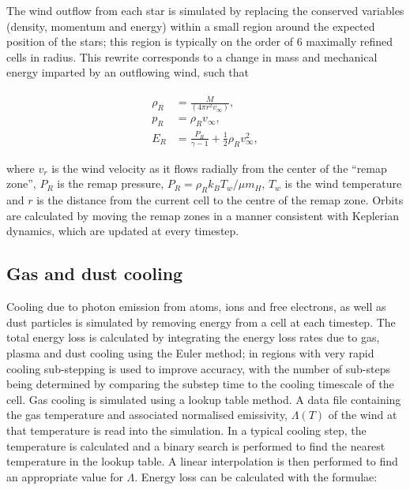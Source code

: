 The wind outflow from each star is simulated by replacing the conserved variables (density, momentum and energy) within a small region around the expected position of the stars; this region is typically on the order of 6 maximally refined cells in radius.
This rewrite corresponds to a change in mass and mechanical energy imparted by an outflowing wind, such that

\begin{subequations}
  \begin{align}
    \rho_R & = \frac{\dot M}{(4 \pi r^2 v_\infty)} , \\
    p_{R}  & = \rho_R v_\infty , \\
    E_R    & = \frac{P_R}{\gamma - 1} + \frac{1}{2} \rho_{R} v_\infty^2 ,
  \end{align}
\end{subequations}

\noindent
where $v_r$ is the wind velocity as it flows radially from the center of the ``remap zone'', $P_R$ is the remap pressure, $P_R = \rho_R k_B T_w / \mu m_H$, $T_w$ is the wind temperature and $r$ is the distance from the current cell to the centre of the remap zone.
Orbits are calculated by moving the remap zones in a manner consistent with Keplerian dynamics, which are updated at every timestep.


\subsection{Gas and dust cooling} \label{sec:gas-dust-cooling}

Cooling due to photon emission from atoms, ions and free electrons, as well as dust particles is simulated by removing energy from a cell at each timestep.
The total energy loss is calculated by integrating the energy loss rates due to gas, plasma and dust cooling using the Euler method; in regions with very rapid cooling sub-stepping is used to improve accuracy, with the number of sub-steps being determined by comparing the substep time to the cooling timescale of the cell.
Gas cooling is simulated using a lookup table method.
A data file containing the gas temperature and associated normalised emissivity, $\Lambda(T)$ of the wind at that temperature is read into the simulation.
In a typical cooling step, the temperature is calculated and a binary search is performed to find the nearest temperature in the lookup table.
A linear interpolation is then performed to find an appropriate value for $\Lambda$.
Energy loss can be calculated with the formulae:

